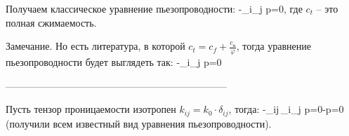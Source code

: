 \documentclass[main.tex]{subfiles}
\begin{document}
Получаем классическое уравнение пьезопроводности:
\beq
{}-\partial_i\partial_j p=0,
\eeq
где $c_t$ -- это полная сжимаемость.

Замечание. Но есть литература, в которой $c_t=c_f+\frac{c_\text{п}}{\varphi}$, тогда уравнение пьезопроводности будет выглядеть так:
\beq
{}-\partial_i\partial_j p=0
\eeq

--------------------------------------------------------------------

Пусть тензор проницаемости изотропен $k_{ij}=k_0\cdot\delta_{ij}$, тогда:
\beq
{}-\delta_{ij}\,\partial_i\partial_j p=0\Leftrightarrow{}-\Delta p=0
\eeq
(получили всем известный вид уравнения пьезопроводности).
\end{document}
